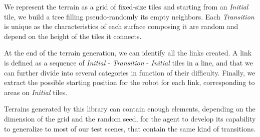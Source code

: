 We represent the terrain as a grid of fixed-size tiles and starting from an \textit{Initial} tile, we build a tree filling pseudo-randomly its empty neighbors. Each \textit{Transition} is unique as the characteristics of each surface composing it are random and depend on the height of the tiles it connects.

At the end of the terrain generation, we can identify all the links created. 
A link is defined as a sequence of \textit{Initial} - \textit{Transition} - \textit{Initial} tiles in a line, and that we can further divide into several categories in function of their difficulty. 
Finally, we extract the possible starting position for the robot for each link, corresponding to areas on \textit{Initial} tiles. 

Terrains generated by this library can contain enough elements, depending on the dimension of the grid and the random seed, for the agent to develop its capability to generalize to most of our test scenes, that contain the same kind of transitions.

